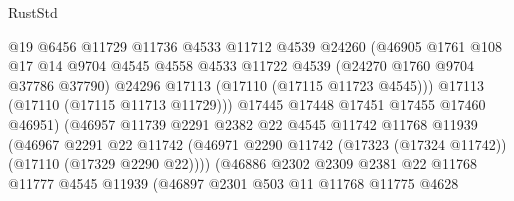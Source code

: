 \begin{lexlean}{RustStd}
\begin{coremodule}
                                @19
                                @6456
                                @11729
                                @11736
                                @4533
                                @11712
                                @4539
                                @24260
                                (@46905
                                  @1761
                                  @108
                                  @17
                                  @14
                                  @9704
                                  @4545
                                  @4558
                                  @4533
                                  @11722
                                  @4539
                                  (@24270 @1760 @9704 @37786 @37790)
                                  @24296
                                  @17113
                                  (@17110 (@17115 @11723 @4545)))
                                @17113
                                (@17110 (@17115 @11713 @11729)))
                              @17445
                              @17448
                              @17451
                              @17455
                              @17460
                              @46951)
                            (@46957
                              @11739
                              @2291
                              @2382
                              @22
                              @4545
                              @11742
                              @11768
                              @11939
                              (@46967
                                @2291
                                @22
                                @11742
                                (@46971
                                  @2290
                                  @11742
                                  (@17323 (@17324 @11742))
                                  (@17110 (@17329 @2290 @22))))
                              (@46886
                                @2302
                                @2309
                                @2381
                                @22
                                @11768
                                @11777
                                @4545
                                @11939
                                (@46897
                                  @2301
                                  @503
                                  @11
                                  @11768
                                  @11775
                                  @4628

\end{coremodule}
\end{lexlean}
